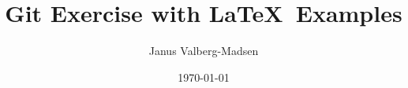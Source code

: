 \documentclass[10pt,a4paper]{article}
\title{Git Exercise with \LaTeX\ Examples}
\author{Janus Valberg-Madsen}
\date{\today}
\begin{document}
\maketitle

\begin{abstract}
  
  
\end{abstract}

\tableofcontents



\end{document}
